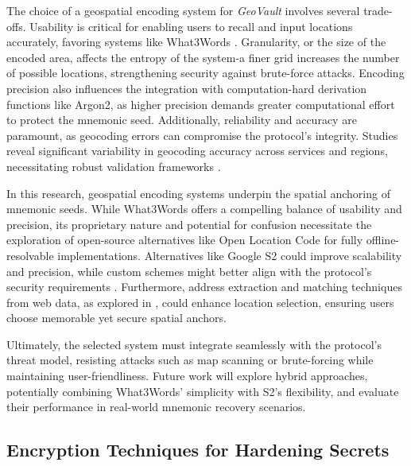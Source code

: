 \documentclass[journal,article,submit,pdftex,moreauthors]{Definitions/mdpi}
\newcommand{\add}[1]{#1}
\newcommand{\remove}[1]{}
\newcommand{\add}[1]{\added{#1}}
\newcommand{\remove}[1]{\deleted{#1}}
\begin{document}
The choice of a geospatial encoding system for \textit{GeoVault} involves several trade-offs. Usability is critical for enabling users to recall and input locations accurately, favoring systems like What3Words \cite{Jiang2018a}. Granularity, or the size of the encoded area, affects the entropy of the system-a finer grid increases the number of possible locations, strengthening security against brute-force attacks. Encoding precision also influences the integration with computation-hard derivation functions like Argon2, as higher precision demands greater computational effort to protect the mnemonic seed. Additionally, reliability and accuracy are paramount, as geocoding errors can compromise the protocol's integrity. Studies reveal significant variability in geocoding accuracy across services and regions, necessitating robust validation frameworks \cite{Goldberg2013, Zandbergen2008a}.

In this research, geospatial encoding systems underpin the spatial anchoring of mnemonic seeds. While What3Words offers a compelling balance of usability and precision, its proprietary nature and potential for confusion \cite{Arthur2023} necessitate the exploration of open-source alternatives like Open Location Code for fully offline-resolvable implementations. Alternatives like Google S2 could improve scalability and precision, while custom schemes might better align with the protocol's security requirements \cite{Mai2022}. Furthermore, address extraction and matching techniques from web data, as explored in \cite{Efremova2018}, could enhance location selection, ensuring users choose memorable yet secure spatial anchors.

Ultimately, the selected system must integrate seamlessly with the protocol's threat model, resisting attacks such as map scanning or brute-forcing while maintaining user-friendliness. Future work will explore hybrid approaches, potentially combining What3Words' simplicity with S2's flexibility, and evaluate their performance in real-world mnemonic recovery scenarios.

\subsection{\remove{Encryption Techniques for Burying Secrets} \add{Encryption Techniques for Hardening Secrets}}

\remove{Secure storage of mnemonic seeds in the \textit{GeoVault} protocol relies on cryptographic techniques that impose significant computational barriers to unauthorized recovery while ensuring practical access for legitimate users. This section examines four mechanisms-memory-hard key derivation functions (KDFs), verifiable delay functions (VDFs), time-lock puzzles, and proofs of sequential work (PoSW)-that protect against brute-force attacks by leveraging memory, time, or sequential computation. Each technique is illustrated with a scientific example to demonstrate its role in securing spatially anchored mnemonic seeds.}
\end{document}
